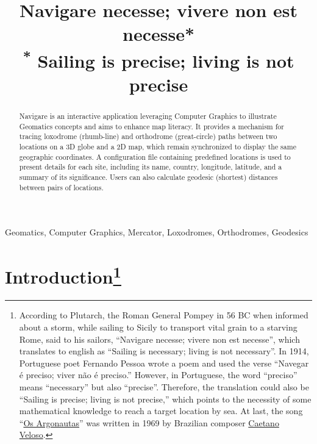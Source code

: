 \documentclass[conference]{IEEEtran}
\begin{document}
\title{Navigare necesse; vivere non est necesse*\\
{\footnotesize \textsuperscript{*}
Sailing is precise; living is not precise}
}

\author{
}

\maketitle

\begin{abstract}
    Navigare is an interactive application leveraging Computer Graphics to illustrate Geomatics concepts and aims to enhance map literacy.
    It provides a mechanism for tracing loxodrome (rhumb-line) and orthodrome (great-circle) paths between two locations on a 3D globe and a 2D map,
    which remain synchronized to display the same geographic coordinates. A configuration file containing predefined locations is used to present
    details for each site, including its name, country, longitude, latitude, and a summary of its significance.
    Users can also calculate geodesic (shortest) distances between pairs of locations.
\end{abstract}

\begin{IEEEkeywords}
    Geomatics, Computer Graphics, Mercator, Loxodromes, Orthodromes, Geodesics
\end{IEEEkeywords}

\section{Introduction\footnote{According to Plutarch,
the Roman General Pompey in 56 BC when informed about a storm,
while sailing to Sicily to transport vital grain to a starving Rome, said to his sailors,
``Navigare necesse; vivere non est necesse'', which translates to english as ``Sailing is necessary; living is not necessary''.
In 1914, Portuguese poet Fernando Pessoa \cite{pessoa1914navegar} wrote a poem
and used the verse ``Navegar é preciso; viver não é preciso.''
However, in Portuguese, the word ``preciso'' means ``necessary'' but also ``precise''.
Therefore, the translation could also be ``Sailing is precise; living is not precise,''
which points to the necessity of some mathematical
knowledge to reach a target location by sea. At last,
the song ``\href{https://krotalias.github.io/cwdc/13-webgl/extras/images/aod.mp4}{Os Argonautas}''
was written in 1969 by Brazilian composer
\href{https://en.wikipedia.org/wiki/Caetano_Veloso}{Caetano Veloso}.}}
\end{document}

